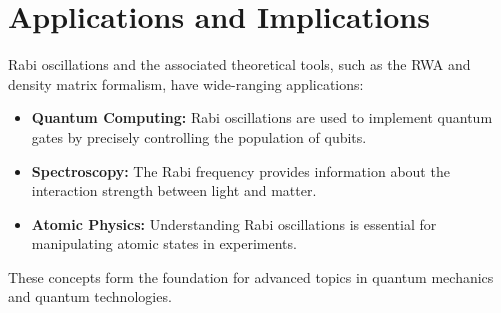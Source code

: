 
\section{Applications and Implications}

Rabi oscillations and the associated theoretical tools, such as the RWA and density matrix formalism, have wide-ranging applications:
\begin{itemize}
	\item \textbf{Quantum Computing:} Rabi oscillations are used to implement quantum gates by precisely controlling the population of qubits.
	\item \textbf{Spectroscopy:} The Rabi frequency provides information about the interaction strength between light and matter.
	\item \textbf{Atomic Physics:} Understanding Rabi oscillations is essential for manipulating atomic states in experiments.
\end{itemize}

These concepts form the foundation for advanced topics in quantum mechanics and quantum technologies.
